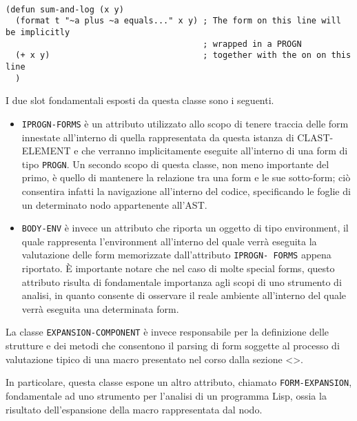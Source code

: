 \begin{lstlisting}[caption=Esempio di costrutto che fa utilizzo di del
costrutto PROGN in modo implicito]

(defun sum-and-log (x y)
  (format t "~a plus ~a equals..." x y) ; The form on this line will be implicitly
                                        ; wrapped in a PROGN
  (+ x y)                               ; together with the on on this line
  )

\end{lstlisting}

I due slot fondamentali esposti da questa classe sono i seguenti.\\

\begin{itemize}

\item \texttt{IPROGN-FORMS} è un attributo utilizzato allo scopo di tenere
traccia delle form innestate all’interno di quella rappresentata da questa
istanza di CLAST-ELEMENT e che verranno implicitamente eseguite all’interno di
una form di tipo \texttt{PROGN}. Un secondo scopo di questa classe, non meno
importante del primo, è quello di mantenere la relazione tra una form e le sue
sotto-form; ciò consentira infatti la navigazione all'interno del codice,
specificando le foglie di un determinato nodo appartenente all'AST.

\item \texttt{BODY-ENV} è invece un attributo che riporta un oggetto di tipo
environment, il quale rappresenta l’environment all’interno del quale verrà
eseguita la valutazione delle form memorizzate dall’attributo \texttt{IPROGN-
FORMS} appena riportato. È importante notare che nel caso di molte special
forms, questo attributo risulta di fondamentale importanza agli scopi di uno
strumento di analisi, in quanto consente di osservare il reale ambiente
all'interno del quale verrà eseguita una determinata form.

\end{itemize}

La classe \texttt{EXPANSION-COMPONENT} è invece responsabile per la
definizione delle strutture e dei metodi che consentono il parsing di form
soggette al processo di valutazione tipico di una macro presentato nel corso
dalla sezione <>.

In particolare, questa classe espone un altro attributo, chiamato \texttt
{FORM-EXPANSION}, fondamentale ad uno strumento per l’analisi di un programma
Lisp, ossia la risultato dell’espansione della macro rappresentata dal nodo.\\

